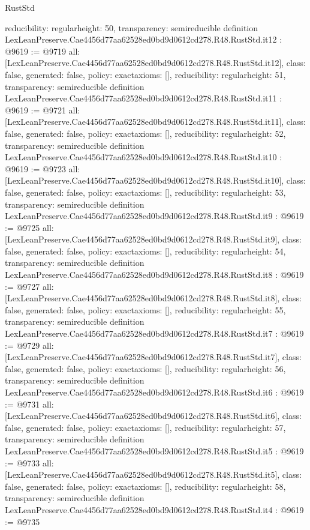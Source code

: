 \begin{lexlean}{RustStd}
\begin{coremodule}
{  reducibility: regular{height: 50},
  transparency: semireducible
}
definition LexLeanPreserve.Cae4456d77aa62528ed0bd9d0612cd278.R48.RustStd.it12 : @9619 := @9719 {
  all: [LexLeanPreserve.Cae4456d77aa62528ed0bd9d0612cd278.R48.RustStd.it12],
  class: false,
  generated: false,
  policy: exact{axioms: []},
  reducibility: regular{height: 51},
  transparency: semireducible
}
definition LexLeanPreserve.Cae4456d77aa62528ed0bd9d0612cd278.R48.RustStd.it11 : @9619 := @9721 {
  all: [LexLeanPreserve.Cae4456d77aa62528ed0bd9d0612cd278.R48.RustStd.it11],
  class: false,
  generated: false,
  policy: exact{axioms: []},
  reducibility: regular{height: 52},
  transparency: semireducible
}
definition LexLeanPreserve.Cae4456d77aa62528ed0bd9d0612cd278.R48.RustStd.it10 : @9619 := @9723 {
  all: [LexLeanPreserve.Cae4456d77aa62528ed0bd9d0612cd278.R48.RustStd.it10],
  class: false,
  generated: false,
  policy: exact{axioms: []},
  reducibility: regular{height: 53},
  transparency: semireducible
}
definition LexLeanPreserve.Cae4456d77aa62528ed0bd9d0612cd278.R48.RustStd.it9 : @9619 := @9725 {
  all: [LexLeanPreserve.Cae4456d77aa62528ed0bd9d0612cd278.R48.RustStd.it9],
  class: false,
  generated: false,
  policy: exact{axioms: []},
  reducibility: regular{height: 54},
  transparency: semireducible
}
definition LexLeanPreserve.Cae4456d77aa62528ed0bd9d0612cd278.R48.RustStd.it8 : @9619 := @9727 {
  all: [LexLeanPreserve.Cae4456d77aa62528ed0bd9d0612cd278.R48.RustStd.it8],
  class: false,
  generated: false,
  policy: exact{axioms: []},
  reducibility: regular{height: 55},
  transparency: semireducible
}
definition LexLeanPreserve.Cae4456d77aa62528ed0bd9d0612cd278.R48.RustStd.it7 : @9619 := @9729 {
  all: [LexLeanPreserve.Cae4456d77aa62528ed0bd9d0612cd278.R48.RustStd.it7],
  class: false,
  generated: false,
  policy: exact{axioms: []},
  reducibility: regular{height: 56},
  transparency: semireducible
}
definition LexLeanPreserve.Cae4456d77aa62528ed0bd9d0612cd278.R48.RustStd.it6 : @9619 := @9731 {
  all: [LexLeanPreserve.Cae4456d77aa62528ed0bd9d0612cd278.R48.RustStd.it6],
  class: false,
  generated: false,
  policy: exact{axioms: []},
  reducibility: regular{height: 57},
  transparency: semireducible
}
definition LexLeanPreserve.Cae4456d77aa62528ed0bd9d0612cd278.R48.RustStd.it5 : @9619 := @9733 {
  all: [LexLeanPreserve.Cae4456d77aa62528ed0bd9d0612cd278.R48.RustStd.it5],
  class: false,
  generated: false,
  policy: exact{axioms: []},
  reducibility: regular{height: 58},
  transparency: semireducible
}
definition LexLeanPreserve.Cae4456d77aa62528ed0bd9d0612cd278.R48.RustStd.it4 : @9619 := @9735 {
}
\end{coremodule}
\end{lexlean}
